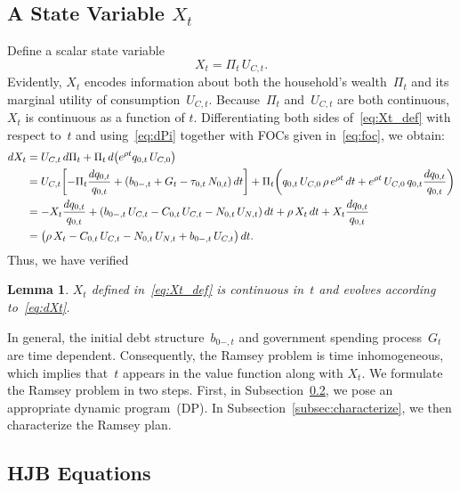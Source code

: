 \documentclass[12pt]{article}
\newtheorem{lemma}[theorem]{Lemma}
\begin{document}
{\subsection{A State Variable $X_t$}

Define a scalar state variable
\begin{equation}\label{eq:Xt_def}
X_t = \Pi_t\, U_{C,t}. 
\end{equation}
{Evidently, $X_t$ encodes information about both the household's wealth~$\Pi_t$ and its marginal utility of consumption~$U_{C,t}$.} Because~$\Pi_t$ and~$U_{C,t}$ are both continuous, $X_t$ is continuous as a function of $t$.
Differentiating both sides of~\eqref{eq:Xt_def} with respect to~$t$ and using~\eqref{eq:dPi} together with FOCs given in~\eqref{eq:foc}, we obtain:
\begin{align}
dX_t &= U_{C,t}\, d\Pi_t + \Pi_t\, d\bigl(e^{\rho t} q_{0,t}\, U_{C,0}\bigr) \notag\\
&= U_{C,t}\biggl[-\Pi_t\frac{dq_{0,t}}{q_{0,t}} + (b_{0-,t}+G_t-\tau_{0,t}\, N_{0,t})\, dt\biggr] + \Pi_t\biggl(q_{0,t}\, U_{C,0}\, \rho\, e^{\rho t}\, dt + e^{\rho t}\, U_{C,0}\, q_{0,t}\frac{dq_{0,t}}{q_{0,t}}\biggr) \notag\\
&= -X_t\frac{dq_{0,t}}{q_{0,t}} + (b_{0-,t}\, U_{C,t} - C_{0,t}\, U_{C,t} - N_{0,t}\, U_{N,t})\, dt + \rho\, X_t\, dt + X_t\frac{dq_{0,t}}{q_{0,t}} \notag\\
&= \bigl(\rho\, X_t - C_{0,t}\, U_{C,t} - N_{0,t}\, U_{N,t} + b_{0-,t}\, U_{C,t}\bigr)\, dt. \label{eq:dXt}
\end{align}
Thus, we have verified %

\begin{lemma}\label{lem:Xt_cts}
	$X_t$ defined in~\eqref{eq:Xt_def} is continuous in~$t$ and  evolves according to~\eqref{eq:dXt}.
\end{lemma}

In general, the  initial debt structure~$b_{0-,t}$ and government spending process~$G_t$ are  time dependent. Consequently,  the Ramsey problem is time inhomogeneous, which implies that~$t$  appears in the value function along with $X_t$. 
We formulate the Ramsey problem in two steps. First,  in Subsection~\ref{subsec:DP}, %
we pose an appropriate  dynamic program~(DP).
In Subsection~\ref{subsec:characterize},  we then characterize the  Ramsey plan.


\subsection{HJB Equations}%
\label{subsec:DP}

}
\end{document}
